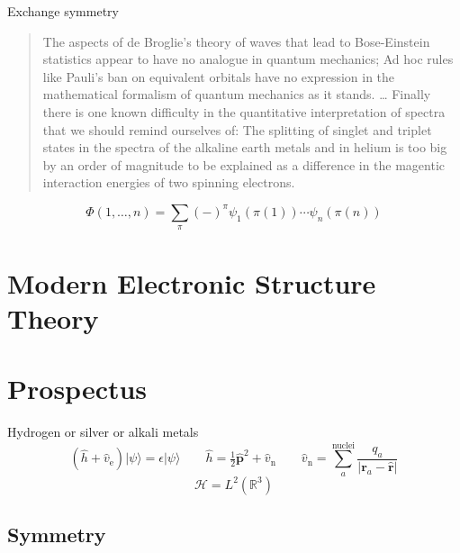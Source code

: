 \noindent
Exchange symmetry\cite{Heisenberg:1926p411}
\begin{quote}
    The aspects of de Broglie's theory of waves that lead to Bose-Einstein
    statistics\cite{Bose:1924p178,Einstein:1924p261,Einstein:1925p3} appear to
    have no analogue in quantum mechanics;
    Ad hoc rules like Pauli's ban on equivalent orbitals have no expression in
    the mathematical formalism of quantum mechanics as it stands.
    \dots
    Finally there is one known difficulty in the quantitative interpretation of
    spectra that we should remind ourselves of:
    The splitting of singlet and triplet states in the spectra of the alkaline
    earth metals and in helium is too big by an order of magnitude to be
    explained as a difference in the magentic interaction energies of two
    spinning electrons.
\end{quote}


\begin{equation}
    \Phi(1, \ldots, n)
    =
    \sum_{\pi}
    (-)^\pi
    \psi_1(\pi(1))
    \cdots
    \psi_n(\pi(n))
\end{equation}



\section{Modern Electronic Structure Theory}


\section{Prospectus}



\newpage
Hydrogen or silver or alkali metals
\begin{equation}
    (\hat{h} + \hat{v}_\mathrm{e})
    |\psi\rangle
    =
    \epsilon
    |\psi\rangle
    \qquad
    \hat{h}
    =
    \tfrac{1}{2}
    \hat{\mathbf{p}}^2
    +
    \hat{v}_\mathrm{n}
    \qquad
    \hat{v}_\mathrm{n}
    =
    \sum_a^{\mathrm{nuclei}}
    \frac{q_a}{|\mathbf{r}_a-\hat{\mathbf{r}}|}
\end{equation}
\begin{equation}
    \mathcal{H}
    =
    L^2(\mathbb{R}^3)
\end{equation}

\subsection{Symmetry}

